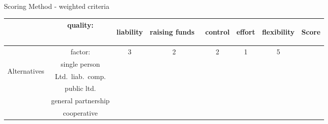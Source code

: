 \begin{frame}{Scoring Method - weighted criteria}
    \begin{tabular}{|c|c|c|c|c|c|c|c|}
    \hline 
     & quality: & \begin{turn}{90}
    liability
    \end{turn} & \begin{turn}{90}
    raising funds~
    \end{turn} & \begin{turn}{90}
    control
    \end{turn} & \begin{turn}{90}
    effort
    \end{turn} & \begin{turn}{90}
    flexibility
    \end{turn} &  \begin{turn}{90}
    Score
    \end{turn}\tabularnewline
    \hline 
     & factor: & 3 & 2 & 2 & 1 & 5 & \tabularnewline
    \hline 
    \hline 
    \multirow{5}{*}{\begin{turn}{90}
    Alternatives
    \end{turn}} & single person &  &  &  & &  & \tabularnewline
    \cline{2-7} 
     & Ltd.~liab.~comp. &  &  &  &  &  & \tabularnewline
    \cline{2-7} 
     & public ltd. &  &  &  &  &  & \tabularnewline
    \cline{2-7} 
     & general partnership &  &  &  &  &  & \tabularnewline
    \cline{2-7} 
     & cooperative &  &  &  &  &  & \tabularnewline
    \hline 
    \end{tabular}
\end{frame}

